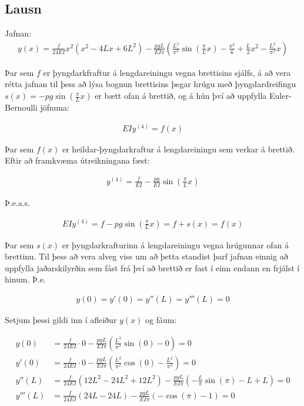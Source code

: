 \documentclass[11pt]{article}
\begin{document}
{\subsection*{Lausn}

Jafnan:
\begin{align*}
y(x)=\frac{f}{24EI}x^2(x^2-4Lx+6L^2)-\frac{pgL}{EI\pi}\left(\frac{L^3}{\pi ^3}\sin\left(\frac{\pi}{L}x\right)-\frac{x^3}{6}+\frac{L}{2}x^2-\frac{L^2}{\pi^2}x\right)
\end{align*}

Þar sem $f$ er þyngdarkfraftur á lengdareiningu vegna brettisins sjálfs, á að vera rétta jafnan til þess að lýsa bognun brettisins þegar hrúgu með þyngdardreifingu $s(x)=-pg\sin\left(\frac{\pi}{L}x\right)$ er bætt ofan á brettið, og á hún því að uppfylla Euler-Bernoulli jöfnuna:

\begin{align*}
EIy^{(4)}=f(x)
\end{align*}

Þar sem $f(x)$ er heildar-þyngdarkraftur á lengdareiningu sem verkar á brettið. Eftir að framkvæma útreikningana fæst:

\begin{align*}
y^{(4)}=\frac{f}{EI}-\frac{pg}{EI}\sin\left(\frac{\pi}{L}x\right)
\end{align*}

Þ.e.a.s.

\begin{align*}
EIy^{(4)}=f-pg\sin\left(\frac{\pi}{L}x\right)=f+s(x)=f(x)
\end{align*}

Þar sem $s(x)$ er þyngdarkrafturinn á lengdareiningu vegna hrúgunnar ofan á brettinu. Til þess að vera alveg viss um að þetta standist þarf jafnan einnig að uppfylla jaðarskilyrðin sem fást frá því að brettið er fast í einn endann en frjálst í hinum. Þ.e.

\begin{align*}
y(0)=y'(0)=y''(L)=y'''(L)=0
\end{align*}

Setjum þessi gildi inn í afleiður $y(x)$ og fáum:

\begin{align*}y(0) &= \frac{f}{24EI}\cdot 0 -\frac{pgL}{EI\pi}\left(\frac{L^3}{\pi^3}\sin(0)-0\right)=0 \\
y'(0) &= \frac{f}{24EI}\cdot 0 -\frac{pgL}{EI\pi}\left(\frac{L^2}{\pi^2}\cos(0)-\frac{L^2}{\pi^2}\right)=0 \\
y''(L) &= \frac{f}{24EI}(12L^2-24L^2+12L^2)-\frac{pgL}{EI\pi}\left(-\frac{L}{\pi}\sin(\pi)-L+L\right)=0 \\
y'''(L) &= \frac{f}{24EI}(24L-24L)-\frac{pgL}{EI\pi}(-\cos(\pi)-1)=0
\end{align*}

}
\end{document}
